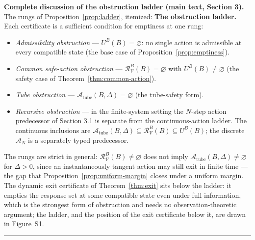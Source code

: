\documentclass[11pt]{article}
\theoremstyle{definition}
\begin{document}
\bigskip
\noindent\textbf{Complete discussion of the obstruction ladder (main text, Section 3).}
The rungs of Proposition~\ref{prop:ladder}, itemized:
\textbf{The obstruction ladder.} Each certificate is a sufficient
condition for emptiness at one rung:
\begin{itemize}
\item \emph{Admissibility obstruction} --- \(U^B(B)=\varnothing\): no
single action is admissible at every compatible state (the base case of
Proposition~\ref{prop:emptiness}).
\item \emph{Common safe-action obstruction} ---
\(\mathcal{R}_{\mathcal{V}}^B(B)=\varnothing\) with
\(U^B(B)\neq\varnothing\) (the safety case of
Theorem~\ref{thm:common-action}).
\item \emph{Tube obstruction} ---
\(\mathcal{A}_{\mathrm{tube}}(B,\Delta)=\varnothing\) (the tube-safety
form).
\item \emph{Recursive obstruction} --- in the finite-system setting the \(N\)-step action predecessor of Section 3.1 is separate from the continuous-action ladder. The continuous inclusions are
\(\mathcal{A}_{\mathrm{tube}}(B,\Delta)\subseteq\mathcal{R}_{\mathcal{V}}^B(B)\subseteq U^B(B)\); the discrete \(\mathcal A_N\) is a separately typed predecessor.
\end{itemize}
The rungs are strict in general: \(\mathcal{R}_{\mathcal{V}}^B(B)\neq\varnothing\)
does not imply \(\mathcal{A}_{\mathrm{tube}}(B,\Delta)\neq\varnothing\)
for \(\Delta>0\), since an instantaneously tangent action may still exit
in finite time --- the gap that Proposition~\ref{prop:uniform-margin}
closes under a uniform margin. The dynamic exit certificate of
Theorem~\ref{thm:exit} sits below the ladder: it empties the response
set at some compatible state even under full information, which is the
strongest form of obstruction and needs no observation-theoretic
argument; the ladder, and the position of the exit certificate below it, are drawn in Figure~S1.
\rule{0.5\linewidth}{0.5pt}
\end{document}
